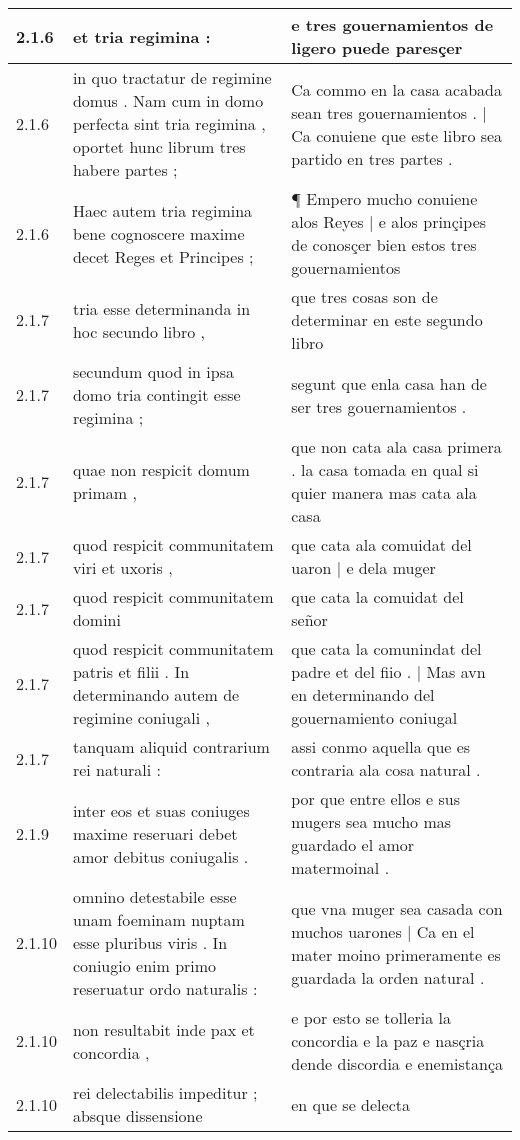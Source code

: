 \begin{tabular}{|p{1cm}|p{6.5cm}|p{6.5cm}|}
2.1.6 & et tria regimina : & e tres gouernamientos de ligero puede paresçer \\\hline
2.1.6 & in quo tractatur de regimine domus . Nam cum in domo perfecta sint tria regimina , oportet hunc librum tres habere partes ; & Ca commo en la casa acabada sean tres gouernamientos . | Ca conuiene que este libro sea partido en tres partes . \\\hline
2.1.6 & Haec autem tria regimina bene cognoscere maxime decet Reges et Principes ; & ¶ Empero mucho conuiene alos Reyes | e alos prinçipes de conosçer bien estos tres gouernamientos \\\hline
2.1.7 & tria esse determinanda in hoc secundo libro , & que tres cosas son de determinar en este segundo libro \\\hline
2.1.7 & secundum quod in ipsa domo tria contingit esse regimina ; & segunt que enla casa han de ser tres gouernamientos . \\\hline
2.1.7 & quae non respicit domum primam , & que non cata ala casa primera . la casa tomada en qual si quier manera mas cata ala casa \\\hline
2.1.7 & quod respicit communitatem viri et uxoris , & que cata ala comuidat del uaron | e dela muger \\\hline
2.1.7 & quod respicit communitatem domini & que cata la comuidat del señor \\\hline
2.1.7 & quod respicit communitatem patris et filii . In determinando autem de regimine coniugali , & que cata la comunindat del padre et del fiio . | Mas avn en determinando del gouernamiento coniugal \\\hline
2.1.7 & tanquam aliquid contrarium rei naturali : & assi conmo aquella que es contraria ala cosa natural . \\\hline
2.1.9 & inter eos et suas coniuges maxime reseruari debet amor debitus coniugalis . & por que entre ellos e sus mugers sea mucho mas guardado el amor matermoinal . \\\hline
2.1.10 & omnino detestabile esse unam foeminam nuptam esse pluribus viris . In coniugio enim primo reseruatur ordo naturalis : & que vna muger sea casada con muchos uarones | Ca en el mater moino primeramente es guardada la orden natural . \\\hline
2.1.10 & non resultabit inde pax et concordia , & e por esto se tolleria la concordia e la paz e nasçria dende discordia e enemistança \\\hline
2.1.10 & rei delectabilis impeditur ; absque dissensione & en que se delecta \\\hline

\end{tabular}
